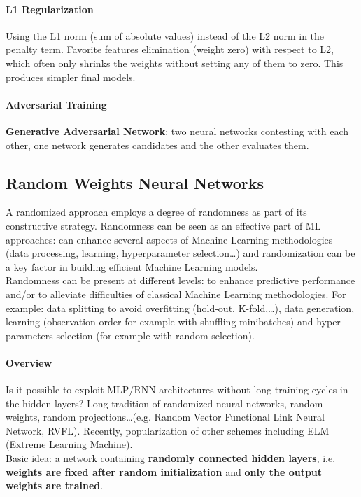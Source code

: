 \documentclass[10pt]{report}
\begin{document}
\paragraph{L1 Regularization}
Using the L1 norm (sum of absolute values) instead of the L2 norm in the penalty term. Favorite features elimination (weight zero) with respect to L2, which often only shrinks the weights without setting any of them to zero. This produces simpler final models.
\paragraph{Adversarial Training} \textbf{Generative Adversarial Network}: two neural networks contesting with each other, one network generates candidates and the other evaluates them.
\subsection{Random Weights Neural Networks} A randomized approach employs a degree of randomness as part of its constructive strategy. Randomness can be seen as an effective part of ML approaches: can enhance several aspects of Machine Learning methodologies (data processing, learning, hyperparameter selection\ldots) and randomization can be a key factor in building efficient Machine Learning models.\\
Randomness can be present at different levels: to enhance predictive performance and/or to alleviate difficulties of classical Machine Learning methodologies. For example: data splitting to avoid overfitting (hold-out, K-fold,\ldots), data generation, learning (observation order for example with shuffling minibatches) and hyper-parameters selection (for example with random selection).
\paragraph{Overview} Is it possible to exploit MLP/RNN architectures without long training cycles in the hidden layers? Long tradition of randomized neural networks, random weights, random projections\ldots (e.g. Random Vector Functional Link Neural Network, RVFL). Recently, popularization of other schemes including ELM (Extreme Learning Machine).\\
Basic idea: a network containing \textbf{randomly connected hidden layers}, i.e. \textbf{weights are fixed after random initialization} and \textbf{only the output weights are trained}.
\end{document}
